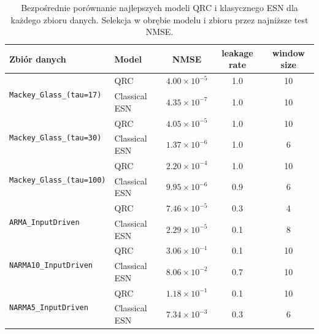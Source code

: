 \begin{table}[ht]
\centering
\caption{Bezpośrednie porównanie najlepszych modeli QRC i klasycznego ESN dla każdego zbioru danych. Selekcja w obrębie modelu i zbioru przez najniższe test NMSE.}
\label{tab:qrc-vs-esn-comparison}
\begin{tabular}{llccc}
\toprule
Zbiór danych & Model & NMSE & leakage rate & window size \\
\midrule
\multirow{2}{*}{\texttt{Mackey\_Glass\_(tau=17)}} & QRC & $4.00 \times 10^{-5}$ & 1.0 & 10 \\
& Classical ESN & $4.35 \times 10^{-7}$ & 1.0 & 10 \\
\midrule
\multirow{2}{*}{\texttt{Mackey\_Glass\_(tau=30)}} & QRC & $4.05 \times 10^{-5}$ & 1.0 & 10 \\
& Classical ESN & $1.37 \times 10^{-6}$ & 1.0 & 6 \\
\midrule
\multirow{2}{*}{\texttt{Mackey\_Glass\_(tau=100)}} & QRC & $2.20 \times 10^{-4}$ & 1.0 & 10 \\
& Classical ESN & $9.95 \times 10^{-6}$ & 0.9 & 6 \\
\midrule
\multirow{2}{*}{\texttt{ARMA\_InputDriven}} & QRC & $7.46 \times 10^{-5}$ & 0.3 & 4 \\
& Classical ESN & $2.29 \times 10^{-5}$ & 0.1 & 8 \\
\midrule
\multirow{2}{*}{\texttt{NARMA10\_InputDriven}} & QRC & $3.06 \times 10^{-1}$ & 0.1 & 10 \\
& Classical ESN & $8.06 \times 10^{-2}$ & 0.7 & 10 \\
\midrule
\multirow{2}{*}{\texttt{NARMA5\_InputDriven}} & QRC & $1.18 \times 10^{-1}$ & 0.1 & 10 \\
& Classical ESN & $7.34 \times 10^{-3}$ & 0.3 & 6 \\
\bottomrule
\end{tabular}
\end{table}